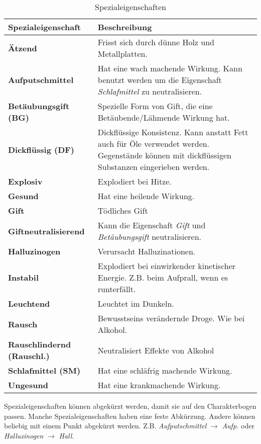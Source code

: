 \begin{table}[H]
\begin{center}
\begin{tabular}{|p{}|p{11cm}|}
\hline
\textbf{Spezialeigenschaft} & \textbf{Beschreibung} \\ \hline
\textbf{Ätzend} & Frisst sich durch dünne Holz und Metallplatten. \\ \hline
\textbf{Aufputschmittel} & Hat eine wach machende Wirkung. Kann benutzt werden um die Eigenschaft \textit{Schlafmittel} zu neutralisieren. \\ \hline
\textbf{Betäubungsgift (BG)} & Spezielle Form von Gift, die eine Betäubende/Lähmende Wirkung hat. \\ \hline
\textbf{Dickflüssig (DF)} & Dickflüssige Konsistenz. Kann anstatt Fett auch für Öle verwendet werden. Gegenstände können mit dickflüssigen Substanzen eingerieben werden. \\ \hline
\textbf{Explosiv} & Explodiert bei Hitze. \\ \hline
\textbf{Gesund} & Hat eine heilende Wirkung. \\ \hline
\textbf{Gift} & Tödliches Gift \\ \hline
\textbf{Giftneutralisierend} & Kann die Eigenschaft \textit{Gift} und \textit{Betäubungsgift} neutralisieren. \\ \hline
\textbf{Halluzinogen} & Verursacht Halluzinationen. \\ \hline
\textbf{Instabil} & Explodiert bei einwirkender kinetischer Energie. Z.B. beim Aufprall, wenn es runterfällt. \\ \hline
\textbf{Leuchtend} & Leuchtet im Dunkeln.  \\ \hline
\textbf{Rausch} & Bewusstseins verändernde Droge. Wie bei Alkohol. \\ \hline
\textbf{Rauschlindernd (Rauschl.)} & Neutralisiert Effekte von Alkohol \\ \hline
\textbf{Schlafmittel (SM)} & Hat eine schläfrig machende Wirkung. \\ \hline
\textbf{Ungesund} & Hat eine krankmachende Wirkung. \\ \hline

\end{tabular}
\end{center}
\caption{Spezialeigenschaften}
\label{tab:spezialeigenschaften}
\end{table}

Spezialeigenschaften können abgekürzt werden, damit sie auf den Charakterbogen passen. Manche Spezialeigenschaften haben eine feste Abkürzung. Andere können beliebig mit einem Punkt abgekürzt werden. Z.B. \textit{Aufputschmittel} $ \rightarrow $ \textit{Aufp.} oder \textit{Halluzinogen} $ \rightarrow $ \textit{Hall.}


